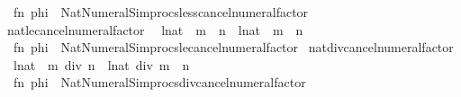 \begin{isabellebody}
\ \ {\isacartoucheopen}fn\ phi\ {\isacharequal}{\kern0pt}{\isachargreater}{\kern0pt}\ Nat{\isacharunderscore}{\kern0pt}Numeral{\isacharunderscore}{\kern0pt}Simprocs{\isachardot}{\kern0pt}less{\isacharunderscore}{\kern0pt}cancel{\isacharunderscore}{\kern0pt}numeral{\isacharunderscore}{\kern0pt}factor{\isacartoucheclose}\isanewline
\isanewline
{}\isamarkupfalse%
\ nat{\isacharunderscore}{\kern0pt}le{\isacharunderscore}{\kern0pt}cancel{\isacharunderscore}{\kern0pt}numeral{\isacharunderscore}{\kern0pt}factor\isanewline
\ \ {\isacharparenleft}{\kern0pt}{\isachardoublequoteopen}{\isacharparenleft}{\kern0pt}l{\isacharcolon}{\kern0pt}{\isacharcolon}{\kern0pt}nat{\isacharparenright}{\kern0pt}\ {\isacharasterisk}{\kern0pt}\ m\ {\isacharless}{\kern0pt}{\isacharequal}{\kern0pt}\ n{\isachardoublequoteclose}\ {\isacharbar}{\kern0pt}\ {\isachardoublequoteopen}{\isacharparenleft}{\kern0pt}l{\isacharcolon}{\kern0pt}{\isacharcolon}{\kern0pt}nat{\isacharparenright}{\kern0pt}\ {\isacharless}{\kern0pt}{\isacharequal}{\kern0pt}\ m\ {\isacharasterisk}{\kern0pt}\ n{\isachardoublequoteclose}{\isacharparenright}{\kern0pt}\ {\isacharequal}{\kern0pt}\isanewline
\ \ {\isacartoucheopen}fn\ phi\ {\isacharequal}{\kern0pt}{\isachargreater}{\kern0pt}\ Nat{\isacharunderscore}{\kern0pt}Numeral{\isacharunderscore}{\kern0pt}Simprocs{\isachardot}{\kern0pt}le{\isacharunderscore}{\kern0pt}cancel{\isacharunderscore}{\kern0pt}numeral{\isacharunderscore}{\kern0pt}factor{\isacartoucheclose}\isanewline
\isanewline
{}\isamarkupfalse%
\ nat{\isacharunderscore}{\kern0pt}div{\isacharunderscore}{\kern0pt}cancel{\isacharunderscore}{\kern0pt}numeral{\isacharunderscore}{\kern0pt}factor\isanewline
\ \ {\isacharparenleft}{\kern0pt}{\isachardoublequoteopen}{\isacharparenleft}{\kern0pt}{\isacharparenleft}{\kern0pt}l{\isacharcolon}{\kern0pt}{\isacharcolon}{\kern0pt}nat{\isacharparenright}{\kern0pt}\ {\isacharasterisk}{\kern0pt}\ m{\isacharparenright}{\kern0pt}\ div\ n{\isachardoublequoteclose}\ {\isacharbar}{\kern0pt}\ {\isachardoublequoteopen}{\isacharparenleft}{\kern0pt}l{\isacharcolon}{\kern0pt}{\isacharcolon}{\kern0pt}nat{\isacharparenright}{\kern0pt}\ div\ {\isacharparenleft}{\kern0pt}m\ {\isacharasterisk}{\kern0pt}\ n{\isacharparenright}{\kern0pt}{\isachardoublequoteclose}{\isacharparenright}{\kern0pt}\ {\isacharequal}{\kern0pt}\isanewline
\ \ {\isacartoucheopen}fn\ phi\ {\isacharequal}{\kern0pt}{\isachargreater}{\kern0pt}\ Nat{\isacharunderscore}{\kern0pt}Numeral{\isacharunderscore}{\kern0pt}Simprocs{\isachardot}{\kern0pt}div{\isacharunderscore}{\kern0pt}cancel{\isacharunderscore}{\kern0pt}numeral{\isacharunderscore}{\kern0pt}factor{\isacartoucheclose}\isanewline

\end{isabellebody}
